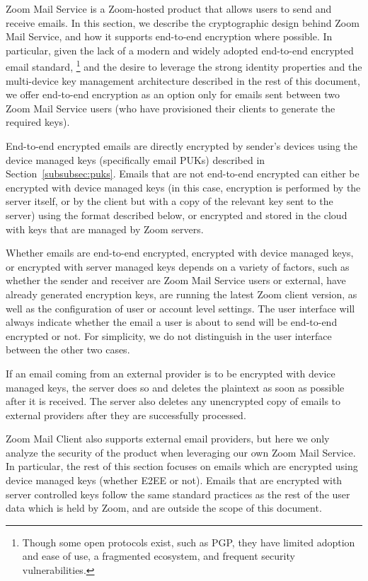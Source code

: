 Zoom Mail Service is a Zoom-hosted product that allows users to send and receive emails. In this
section, we describe the cryptographic design behind Zoom Mail Service, and how it supports
end-to-end encryption where possible. In particular, given the lack of a modern and widely adopted
end-to-end encrypted email standard,%
% 
\footnote{Though some open protocols exist, such as PGP, they have limited adoption and ease of use,
a fragmented ecosystem, and frequent security vulnerabilities.}
%
and the desire to leverage the strong identity properties and the multi-device key management
architecture described in the rest of this document, we offer end-to-end encryption as an option only for emails
sent between two Zoom Mail Service users (who have provisioned their clients to generate the
required keys).

End-to-end encrypted emails are directly encrypted by sender's devices using the device managed keys (specifically email PUKs) described in Section~\ref{subsubsec:puks}. Emails that are not end-to-end encrypted can either be encrypted with device managed keys (in this case, encryption is performed by the server itself, or by the client but with a copy of the relevant key sent to the server) using the format described below, or encrypted and stored in the cloud with keys that are managed by Zoom servers.

Whether emails are end-to-end encrypted, encrypted with device managed keys, or encrypted with
server managed keys depends on a variety of factors, such as whether the sender and receiver are
Zoom Mail Service users or external, have already generated encryption keys, are running the latest
Zoom client version, as well as the configuration of user or account level settings. The user
interface will always indicate whether the email a user is about to send will be end-to-end
encrypted or not. For simplicity, we do not distinguish in the user interface between the other two
cases.

If an email coming from an external provider is to be encrypted with device managed keys, the server
does so and deletes the plaintext as soon as possible after it is received. The server also deletes
any unencrypted copy of emails to external providers after they are successfully processed. 

Zoom Mail Client also supports external email providers, but here we only analyze the security of
the product when leveraging our own Zoom Mail Service. In particular, the rest of this section focuses on emails which are encrypted using device managed keys (whether E2EE or not). Emails that are encrypted with server controlled keys follow the same standard practices as the rest of the user data which is held by Zoom, and are outside the scope of this document.


